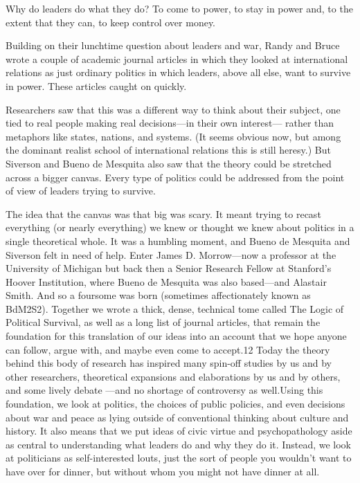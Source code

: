 \documentclass[10pt]{article}
\begin{document}
{\large Why do leaders do what they do? To come to power, to stay in power and,
to the extent that they can, to keep control over money.}

{\large Building on their lunchtime question about leaders and war, Randy and
Bruce wrote a couple of academic journal articles in which they looked at
international relations as just ordinary politics in which leaders, above all
else, want to survive in power. These articles caught on quickly.}

{\large Researchers saw that this was a different way to think about their
subject, one tied to real people making real decisions---in their own interest---
rather than metaphors like states, nations, and systems. (It seems obvious now,
but among the dominant realist school of international relations this is still
heresy.) But Siverson and Bueno de Mesquita also saw that the theory could be
stretched across a bigger canvas. Every type of politics could be addressed from
the point of view of leaders trying to survive.}

{\large The idea that the canvas was that big was scary. It meant trying to
recast everything (or nearly everything) we knew or thought we knew about
politics in a single theoretical whole. It was a humbling moment, and Bueno de
Mesquita and Siverson felt in need of help. Enter James D. Morrow---now a
professor at the University of Michigan but back then a Senior Research Fellow at
Stanford's Hoover Institution, where Bueno de Mesquita was also based---and
Alastair Smith. And so a foursome was born (sometimes affectionately known as
BdM2S2). Together we wrote a thick, dense, technical tome called The Logic of
Political Survival, as well as a long list of journal articles, that remain the
foundation for this translation of our ideas into an account that we hope anyone
can follow, argue with, and maybe even come to accept.12 Today the theory behind
this body of research has inspired many spin-off studies by us and by other
researchers, theoretical expansions and elaborations by us and by others, and
some lively debate ---and no shortage of controversy as well.Using this
foundation, we look at politics, the choices of public policies, and even
decisions about war and peace as lying outside of conventional thinking about
culture and history. It also means that we put ideas of civic virtue and
psychopathology aside as central to understanding what leaders do and why they do
it. Instead, we look at politicians as self-interested louts, just the sort of
people you wouldn't want to have over for dinner, but without whom you might not
have dinner at all.}
\end{document}
